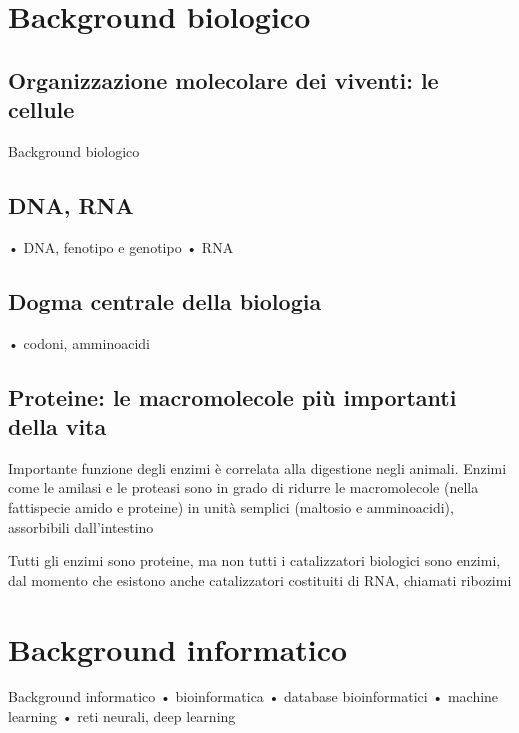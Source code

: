 \section{Background biologico}
\subsection{Organizzazione molecolare dei viventi: le cellule}


Background biologico
\subsection{DNA, RNA}
• DNA, fenotipo e genotipo
• RNA
\subsection{Dogma centrale della biologia}

• codoni, amminoacidi
\subsection{Proteine: le macromolecole più importanti della vita}

Importante funzione degli enzimi è correlata alla digestione negli animali. Enzimi come le amilasi e le proteasi sono in grado di ridurre le macromolecole (nella fattispecie amido e proteine) in unità semplici (maltosio e amminoacidi), assorbibili dall'intestino

Tutti gli enzimi sono proteine, ma non tutti i catalizzatori biologici sono enzimi, dal momento che esistono anche catalizzatori costituiti di RNA, chiamati ribozimi


\section{Background informatico}

Background informatico
• bioinformatica
• database bioinformatici
• machine learning
• reti neurali, deep learning

\clearpage